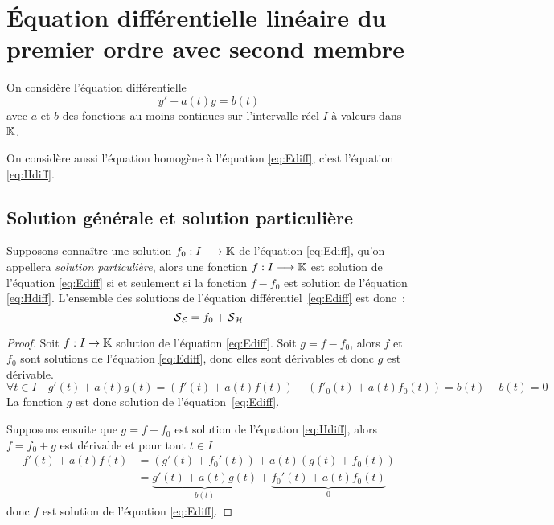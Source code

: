 \section{Équation différentielle linéaire du premier ordre avec
second membre}\label{sec:equadifflinpremierordresecondmembre}

On considère l'équation différentielle
\begin{equation}
  \label{eq:Ediff}
  y' + a(t)y = b(t) \tag{\(\E\)}
\end{equation}
avec \(a\) et \(b\) des fonctions au moins continues sur l'intervalle réel \(I\)
à valeurs dans \(\mathbb{K}\).

On considère aussi l'équation homogène à l'équation \eqref{eq:Ediff}, c'est
l'équation \eqref{eq:Hdiff}.

\subsection{Solution générale et solution particulière}
\label{subsec:solutiongeneraleetpart}

\begin{theo}\label{theo:3}
  Supposons connaître une solution \(f_0:I \longrightarrow{} \mathbb{K}{}{}\) de
  l'équation \eqref{eq:Ediff}, qu'on appellera \emph{solution particulière},
  alors une fonction \(f:I \longrightarrow{} \mathbb{K}{}{}\) est solution de l'équation
  \eqref{eq:Ediff} si et seulement si la fonction \(f-f_0\) est solution de
  l'équation \eqref{eq:Hdiff}. L'ensemble des solutions de l'équation
  différentiel~\eqref{eq:Ediff} est donc~:
  \begin{equation}
    {\mathcal{S}{}}_{\mathcal{E}{}} = f_0 + {\mathcal{S}{}}_{\mathcal{H}{}}
  \end{equation}
\end{theo}
\begin{proof}
  Soit \(f:I \rightarrow \mathbb{K}\) solution de l'équation \eqref{eq:Ediff}. Soit
  \(g = f-f_0\), alors \(f\) et \(f_0\) sont solutions de l'équation
  \eqref{eq:Ediff}, donc elles sont dérivables et donc \(g\) est dérivable.
  \begin{equation}
    \forall t \in I \quad g'(t) + a(t)g(t) =
    (f'(t) + a(t)f(t))-(f'_0(t) + a(t)f_0(t)) = b(t)-b(t) = 0
  \end{equation}
  La fonction \(g\) est donc solution de l'équation~\eqref{eq:Ediff}.

  Supposons ensuite que \(g = f-f_0\) est solution de l'équation
  \eqref{eq:Hdiff}, alors \(f = f_0 + g\) est dérivable et pour tout \(t \in I\)
  \begin{align}
    f'(t) + a(t)f(t)& = (g'(t) + f_0'(t)) + a(t)(g(t) + f_0(t)) \\
                    & = \underbrace{g'(t) + a(t)g(t)}_{b(t)} +
                    \underbrace{f_0'(t) + a(t)f_0(t)}_{0}
  \end{align}
  donc \(f\) est solution de l'équation \eqref{eq:Ediff}.
\end{proof}

